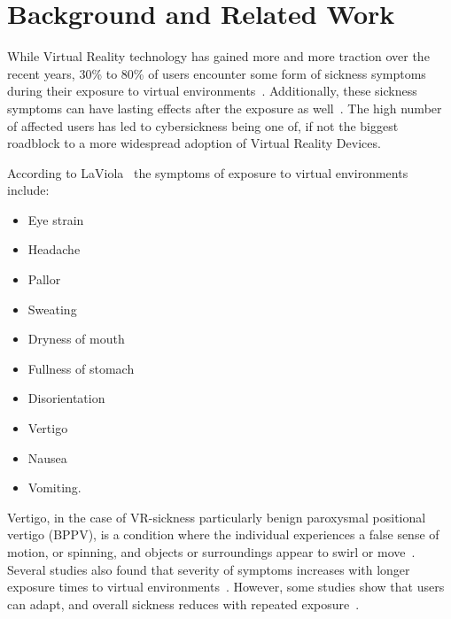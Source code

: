 \chapter{Background and Related Work}\label{ch:background-and-related-work}

While Virtual Reality technology has gained more and more traction over the recent years, 30\% to 80\% of users
encounter some form of sickness symptoms during their exposure to virtual environments~\cite{Rebenitsch2016}.
Additionally, these sickness symptoms can have lasting effects after the exposure as well~\cite{LaViola2000}.
The high number of affected users has led to cybersickness being one of, if not the biggest roadblock to a more
widespread adoption of Virtual Reality Devices.

According to LaViola~\cite{LaViola2000} the symptoms of exposure to virtual environments include:
\begin{itemize}
    \item Eye strain
    \item Headache
    \item Pallor
    \item Sweating
    \item Dryness of mouth
    \item Fullness of stomach
    \item Disorientation
    \item Vertigo
    \item Nausea
    \item Vomiting.
\end{itemize}
Vertigo, in the case of VR-sickness particularly benign paroxysmal positional vertigo (BPPV), is a condition where the
individual experiences a false sense of motion, or spinning, and objects or surroundings appear to swirl or
move~\cite{Post2010}.
\\
Several studies also found that severity of symptoms increases with longer exposure times to virtual environments~\cite{Ruddle2004,Min2004,Duzmanska2018}.
However, some studies show that users can adapt, and overall sickness reduces with repeated exposure~\cite{Hill2000}.

